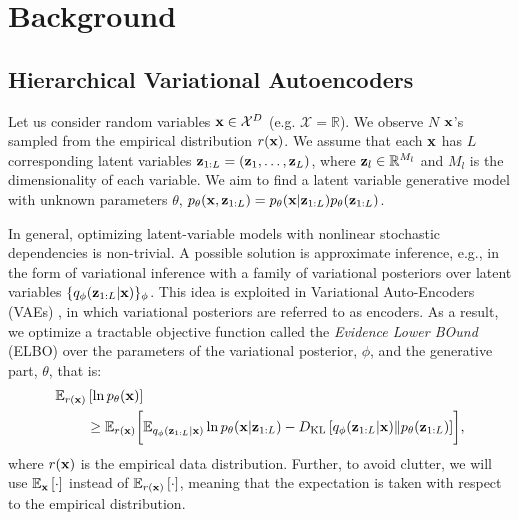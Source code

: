 \section{Background}

\subsection{Hierarchical Variational Autoencoders} \label{sec:5_dvp_vae}

Let us consider random variables ${\mathbf{x}} \in \mathcal{X}^{D}$ (e.g. $\mathcal{X} = \mathbb{R}$). We observe $N$ ${\mathbf{x}}$'s sampled from the empirical distribution $r({\mathbf{x}})$. We assume that each ${\mathbf{x}}$ has $L$ corresponding latent variables ${\mathbf{z}}_{1:L} = ({\mathbf{z}}_1, \dots, {\mathbf{z}}_L)$, where ${\mathbf{z}}_l \in \mathbb{R}^{M_{l}}$ and $M_l$ is the dimensionality of each variable. We aim to find a latent variable generative model with unknown parameters $\theta$, $p_{\theta}({\mathbf{x}}, {\mathbf{z}}_{1:L}) = {p_{\theta}({\mathbf{x}}|{\mathbf{z}}_{1:L})} p_{\theta}({\mathbf{z}}_{1:L})$. 

In general, optimizing latent-variable models with nonlinear stochastic dependencies is non-trivial. A possible solution is approximate inference, e.g., in the form of variational inference \citep{jordan1999introduction} with a family of variational posteriors over latent variables $\{{q_{\phi}({\mathbf{z}}_{1:L}|{\mathbf{x}})}\}_{\phi}$. This idea is exploited in Variational Auto-Encoders (VAEs) \citep{kingma2014autoencoding, rezende2014stochastic}, in which variational posteriors are referred to as encoders. As a result, we optimize a tractable objective function called the \textit{Evidence Lower BOund} (ELBO) over the parameters of the variational posterior, $\phi$, and the generative part, $\theta$, that is:
\begin{equation}\label{eq:vae_elbo}
\begin{aligned}
\E_{r(\rvx)} &\left[\ln p_{\theta}(\rvx)\right]  \\
&\geq \E_{r(\rvx)} \biggl[ \E_{\Enc{\rvz_{1:L}}{\rvx}}\ln \Dec{\rvx}{\rvz_{1:L}} - \KL{\Enc{\rvz_{1:L}}{\rvx}}{p_{\theta}(\rvz_{1:L})} \biggr] ,
\end{aligned}
\end{equation}
where $r({\mathbf{x}})$ is the empirical data distribution. Further, to avoid clutter, we will use $\mathbb{E}_{{\mathbf{x}}}\left[\cdot\right]$ instead of $\mathbb{E}_{r({\mathbf{x}})}\left[\cdot\right]$, meaning that the expectation is taken with respect to the empirical distribution. 

